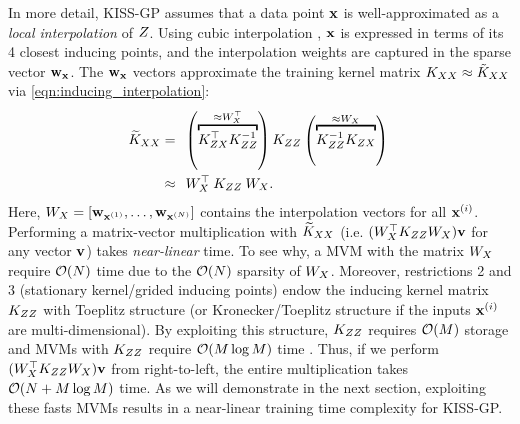 In more detail, KISS-GP assumes that a data point $\mathbf{x}$ is well-approximated as a \emph{local interpolation} of $Z$.
Using cubic interpolation \cite{keys1981cubic}, $\mathbf{x}$ is expressed in terms of its 4 closest inducing points, and the interpolation weights are captured in the sparse vector $\mathbf{w}_{\mathbf{x}}$.
The $\mathbf{w}_{\mathbf{x}}$ vectors approximate the training kernel matrix $K_{XX} \approx \tilde {K}_{XX}$ via \cref{eqn:inducing_interpolation}:
%
\begin{align}
  \widetilde \bK_{\bX\bX} &= \:\:
    \left( \overbracket{ \bK_{\bZ\bX}^\top \bK_{\bZ\bZ}^{-1} }^{ \approx \bW_{\bX}^\top} \right)
    \bK_{\bZ\bZ}
    \left( \overbracket{ \bK_{\bZ\bZ}^{-1} \bK_{\bZ\bX} }^{ \approx \bW_{\bX}} \right)
  \nonumber{} \\
  &\approx \:\: \bW_{\bX}^\top \: \bK_{\bZ\bZ} \: \bW_{\bX}.
  \label{eqn:ski}
\end{align}
%
Here, $W_{X} = [\mathbf{w}_{\mathbf{x}^{(1)}}, \ldots, \mathbf{w}_{\mathbf{x}^{(N)}}]$ contains the interpolation vectors for all $\mathbf{x}^{(i)}$.
Performing a matrix-vector multiplication with $\widetilde {K}_{XX}$ (i.e. $( W_{X}^\top K_{ZZ} W_{X}) \mathbf{v}$ for any vector $\mathbf{v}$) takes \emph{near-linear} time.
To see why, a MVM with the matrix $W_{X}$ require $\bigo{N}$ time due to the $\bigo{N}$ sparsity of $W_{X}$.
Moreover, restrictions 2 and 3 (stationary kernel/grided inducing points) endow the inducing kernel matrix $K_{ZZ}$ with Toeplitz structure (or Kronecker/Toeplitz structure if the inputs $\mathbf{x}^{(i)}$ are multi-dimensional).
By exploiting this structure, $K_{ZZ}$ requires $\bigo{M}$ storage and MVMs with $K_{ZZ}$ require $\bigo{M \log M}$ time \citep[see][for details]{cunningham2008fast,saatcci2012scalable}.
Thus, if we perform $( W_{X}^\top K_{ZZ} W_{X}) \mathbf{v}$ from right-to-left, the entire multiplication takes $\bigo{N + M \log M}$ time.
As we will demonstrate in the next section, exploiting these fasts MVMs results in a near-linear training time complexity for KISS-GP.

%
